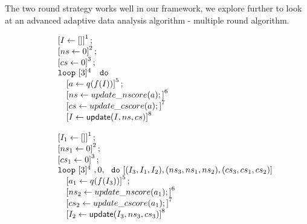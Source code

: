 \begin{example}
%
The two round strategy works well in our framework, we explore further to look at an advanced adaptive data analysis algorithm - multiple round algorithm.
%
%
{\small
\begin{figure}
    \begin{subfigure}{0.4\textwidth}
    \begin{centering}
    $
    \begin{array}{l}
    \left[ I \leftarrow []  \right]^1; \\
    \left[ \mathrel{ ns \leftarrow 0 }  \right]^{2}; \\
     \left[ \mathrel{ cs \leftarrow 0 }  \right]^{3}; \\
    \mathtt{loop} ~ [3]^{4} ~  
    \ ~ \mathtt{do} ~ \\ 
    \quad \left[ a \leftarrow q(f( I))  \right]^{5}; \\
    \quad \left[ \mathrel{ ns \leftarrow update\_nscore(a) };  \right]^{6}\\
    \quad \left[ \mathrel{ cs \leftarrow update\_cscore(a) };  \right]^{7}\\
    \quad \left[ I \leftarrow \mathsf{update} ( I, ns, cs)   \right]^{8}
\end{array}
    $
    \caption{}
    \end{centering}
    \end{subfigure}
    \begin{subfigure}{0.4\textwidth}
    \begin{centering}
    $
    \begin{array}{l}
    \left[ I_1 \leftarrow []  \right]^1; \\
    \left[ \mathrel{ ns_1 \leftarrow 0 }  \right]^{2}; \\
     \left[ \mathrel{ cs_1 \leftarrow 0 }  \right]^{3}; \\
    \mathtt{loop} ~ [3]^{4} ~, 0 ,  
    \ ~ \mathtt{do} ~ [(I_3, I_1,I_2),(ns_3, ns_1,ns_2),(cs_3, cs_1,cs_2) ] \\ 
    \quad \left[ a_1 \leftarrow q(f(I_3))  \right]^{5}; \\
   \quad \left[ \mathrel{ ns_2 \leftarrow update\_nscore(a_1) };  \right]^{6}\\
   \quad \left[ \mathrel{ cs_2 \leftarrow update\_cscore(a_1) };  \right]^{7}\\
   \quad \left[ I_2 \leftarrow \mathsf{update} (I_3, ns_3, cs_3)   \right]^{8}
\end{array}
   $
   \caption{}
    \end{centering}

\end{subfigure}
\end{figure}}
\end{example}
